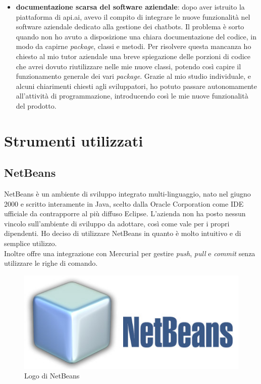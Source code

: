 \begin{itemize}
	\item \textbf{documentazione scarsa del software aziendale}: dopo aver istruito la piattaforma di api.ai, avevo il compito di integrare le nuove funzionalità nel software aziendale dedicato alla gestione dei \glspl{chatbot}. Il problema è sorto quando non ho avuto a disposizione una chiara documentazione del codice, in modo da capirne \emph{package}, classi e metodi. Per risolvere questa mancanza ho chiesto al mio tutor aziendale una breve spiegazione delle porzioni di codice che avrei dovuto riutilizzare nelle mie nuove classi, potendo così capire il funzionamento generale dei vari \emph{package}. Grazie al mio studio individuale, e alcuni chiarimenti chiesti agli sviluppatori, ho potuto passare autonomamente all'attività di programmazione, introducendo così le mie nuove funzionalità del prodotto.
\end{itemize}

\section{Strumenti utilizzati}
\subsection{NetBeans}
NetBeans è un ambiente di sviluppo integrato multi-linguaggio, nato nel giugno 2000 e scritto interamente in Java, scelto dalla Oracle Corporation come \gls{IDE} ufficiale da contrapporre al più diffuso Eclipse.
L'azienda non ha posto nessun vincolo sull'ambiente di sviluppo da adottare, così come vale per i propri dipendenti. Ho deciso di utilizzare NetBeans in quanto è molto intuitivo e di semplice utilizzo.\\
Inoltre offre una integrazione con \gls{Mercurial} per gestire \emph{push}, \emph{pull} e \emph{commit} senza utilizzare le righe di comando.
\begin{figure}[h]
	\centering
	\includegraphics[scale=0.4]{../Immagini/netbeans.jpg}
	\caption{Logo di NetBeans}
\end{figure}
